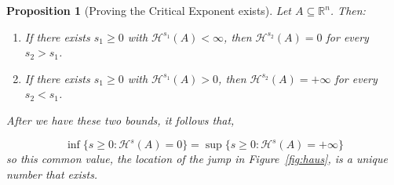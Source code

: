 \documentclass{article}
\newtheorem{proposition}{Proposition}
\begin{document}
\begin{proposition}[Proving the Critical Exponent exists]\label{prop:critical-exponent}
Let $A \subseteq \mathbb{R}^n$. Then:
\begin{enumerate}
    \item If there exists $s_1 \ge 0$ with $\mathcal{H}^{s_1}(A) < \infty$, then $\mathcal{H}^{s_2}(A) = 0$ for every $s_2 > s_1$.
    \item If there exists $s_1 \ge 0$ with $\mathcal{H}^{s_1}(A) > 0$, then $\mathcal{H}^{s_2}(A) = +\infty$ for every $s_2 < s_1$.
\end{enumerate}
After we have these two bounds, it follows that,

$$\inf \{ s \geq 0 : \mathcal{H}^{s}(A)=0 \} = \sup \{ s \geq 0 : \mathcal{H}^{s}(A) = + \infty \}$$
so this common value, the location of the jump in Figure~\ref{fig:haus}, is a unique number that exists.
\end{proposition}
\end{document}
